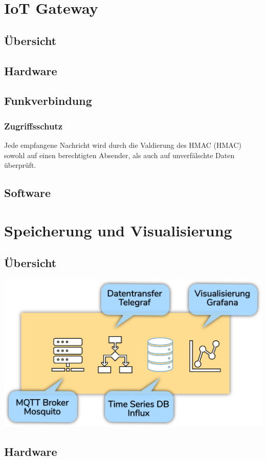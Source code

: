 \documentclass[
  12pt, %
  a4paper, %
  twoside, %
  openright, %
  numbers=noenddot, %
  BCOR=5mm, %
  parskip=half*, %
  thesis, %
]{bfhbook}
\begin{document}
%
\chapter{IoT Gateway}
\section{Übersicht}
\section{Hardware}
\section{Funkverbindung}
\subsection{Zugriffsschutz}
Jede empfangene Nachricht wird durch die Valdierung des HMAC (\Gls{HMAC}) sowohl auf einen berechtigten Absender, als auch auf unverfälschte Daten überprüft.
\section{Software}
\chapter{Speicherung und Visualisierung}
\section{Übersicht}
\begin{center}
\includegraphics[width=17cm, left]{Bilder/Raspberry-Software.png}%
\label{labelname}%
\end{center}
\section{Hardware}
\end{document}
